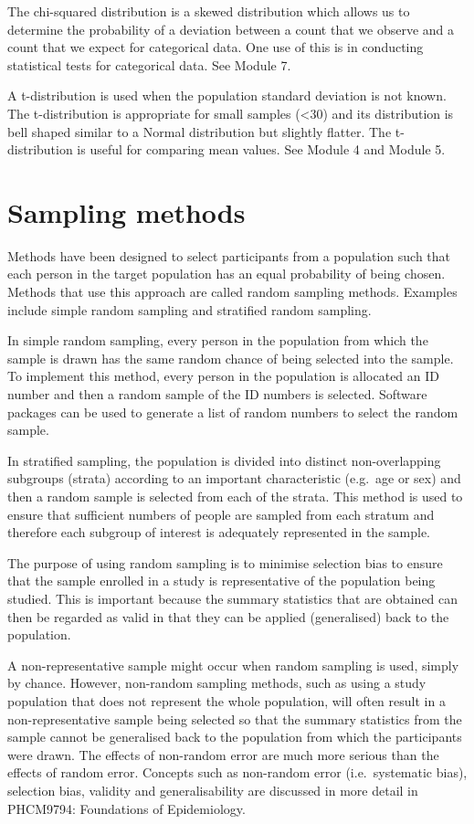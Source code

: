 \documentclass[
  a4paper,
]{memoir}
\begin{document}
The chi-squared distribution is a skewed distribution which allows us to
determine the probability of a deviation between a count that we observe
and a count that we expect for categorical data. One use of this is in
conducting statistical tests for categorical data. See Module 7.

A t-distribution is used when the population standard deviation is not
known. The t-distribution is appropriate for small samples (\textless30)
and its distribution is bell shaped similar to a Normal distribution but
slightly flatter. The t-distribution is useful for comparing mean
values. See Module 4 and Module 5.

\section{Sampling methods}\label{sampling-methods}

Methods have been designed to select participants from a population such
that each person in the target population has an equal probability of
being chosen. Methods that use this approach are called random sampling
methods. Examples include simple random sampling and stratified random
sampling.

In simple random sampling, every person in the population from which the
sample is drawn has the same random chance of being selected into the
sample. To implement this method, every person in the population is
allocated an ID number and then a random sample of the ID numbers is
selected. Software packages can be used to generate a list of random
numbers to select the random sample.

In stratified sampling, the population is divided into distinct
non-overlapping subgroups (strata) according to an important
characteristic (e.g.~age or sex) and then a random sample is selected
from each of the strata. This method is used to ensure that sufficient
numbers of people are sampled from each stratum and therefore each
subgroup of interest is adequately represented in the sample.

The purpose of using random sampling is to minimise selection bias to
ensure that the sample enrolled in a study is representative of the
population being studied. This is important because the summary
statistics that are obtained can then be regarded as valid in that they
can be applied (generalised) back to the population.

A non-representative sample might occur when random sampling is used,
simply by chance. However, non-random sampling methods, such as using a
study population that does not represent the whole population, will
often result in a non-representative sample being selected so that the
summary statistics from the sample cannot be generalised back to the
population from which the participants were drawn. The effects of
non-random error are much more serious than the effects of random error.
Concepts such as non-random error (i.e.~systematic bias), selection
bias, validity and generalisability are discussed in more detail in
PHCM9794: Foundations of Epidemiology.
\end{document}
